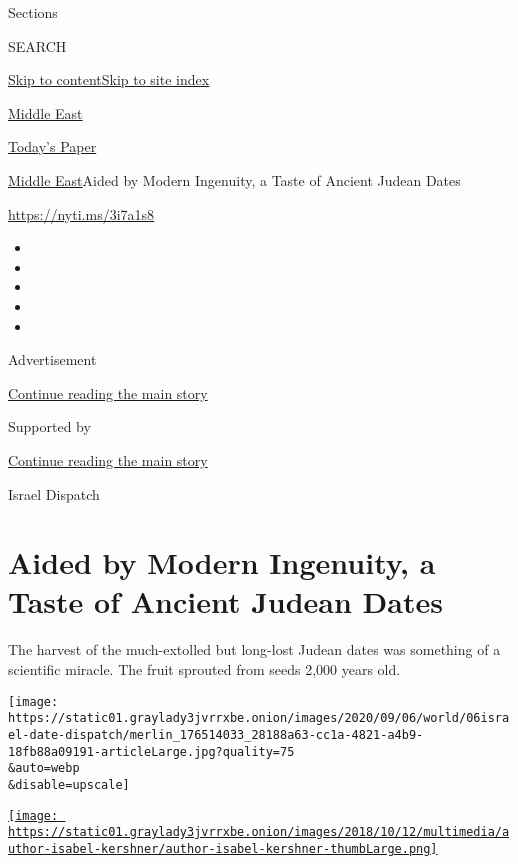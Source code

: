 Sections

SEARCH

\protect\hyperlink{site-content}{Skip to
content}\protect\hyperlink{site-index}{Skip to site index}

\href{https://www.nytimes3xbfgragh.onion/section/world/middleeast}{Middle
East}

\href{https://myaccount.nytimes3xbfgragh.onion/auth/login?response_type=cookie\&client_id=vi}{}

\href{https://www.nytimes3xbfgragh.onion/section/todayspaper}{Today's
Paper}

\href{/section/world/middleeast}{Middle East}\textbar{}Aided by Modern
Ingenuity, a Taste of Ancient Judean Dates

\url{https://nyti.ms/3i7a1s8}

\begin{itemize}
\item
\item
\item
\item
\item
\end{itemize}

Advertisement

\protect\hyperlink{after-top}{Continue reading the main story}

Supported by

\protect\hyperlink{after-sponsor}{Continue reading the main story}

Israel Dispatch

\hypertarget{aided-by-modern-ingenuity-a-taste-of-ancient-judean-dates}{%
\section{Aided by Modern Ingenuity, a Taste of Ancient Judean
Dates}\label{aided-by-modern-ingenuity-a-taste-of-ancient-judean-dates}}

The harvest of the much-extolled but long-lost Judean dates was
something of a scientific miracle. The fruit sprouted from seeds 2,000
years old.

\texttt{[image: https://static01.graylady3jvrrxbe.onion/images/2020/09/06/world/06israel-date-dispatch/merlin\_176514033\_28188a63-cc1a-4821-a4b9-18fb88a09191-articleLarge.jpg?quality=75\\\&auto=webp\\\&disable=upscale]}

\href{https://www.nytimes3xbfgragh.onion/by/isabel-kershner}{\texttt{[image: https://static01.graylady3jvrrxbe.onion/images/2018/10/12/multimedia/author-isabel-kershner/author-isabel-kershner-thumbLarge.png]}}

